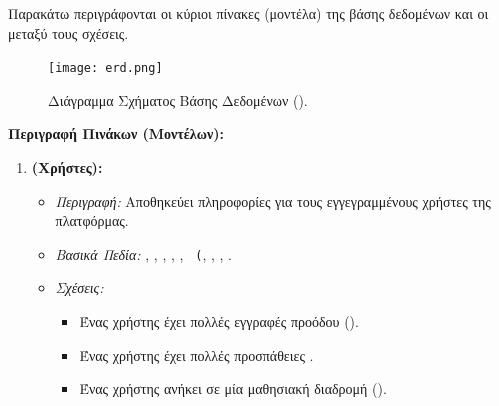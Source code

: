 Παρακάτω περιγράφονται οι κύριοι πίνακες (μοντέλα) της βάσης δεδομένων και οι μεταξύ τους σχέσεις.

\begin{figure}[h!]
  \centering
  \texttt{[image: erd.png]}
  \caption{Διάγραμμα Σχήματος Βάσης Δεδομένων ().}
  \label{fig:erd_placeholder_detailed}
\end{figure}
\clearpage

\textbf{Περιγραφή Πινάκων (Μοντέλων):}

\begin{enumerate}[leftmargin=*, label=\arabic*., wide, labelwidth=!, labelindent=0pt, itemsep=1ex]
    \item \textbf{\texttt{} (Χρήστες):}
        \begin{itemize}[leftmargin=1.5em, noitemsep]
            \item \textit{Περιγραφή:} Αποθηκεύει πληροφορίες για τους εγγεγραμμένους χρήστες της πλατφόρμας.
            \item \textit{Βασικά Πεδία:} \texttt{}, \texttt{}, \texttt{}, \texttt{}, \texttt{}, \texttt{ (}, \texttt{}, \texttt{}, \texttt{}.
            \item \textit{Σχέσεις:}
            \begin{itemize}[leftmargin=1.5em, noitemsep]
                \item Ένας χρήστης έχει πολλές εγγραφές προόδου ().
                \item Ένας χρήστης έχει πολλές προσπάθειες .
                \item Ένας χρήστης ανήκει σε μία μαθησιακή διαδρομή ().
            \end{itemize}
        \end{itemize}


\end{enumerate}
